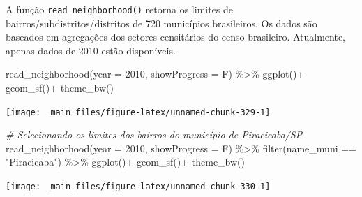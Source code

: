 \documentclass[
  brazilian,
]{book}
\newenvironment{Shaded}{\begin{snugshade}}{\end{snugshade}}
\newcommand{\AttributeTok}[1]{\textcolor[rgb]{0.77,0.63,0.00}{#1}}
\newcommand{\CommentTok}[1]{\textcolor[rgb]{0.56,0.35,0.01}{\textit{#1}}}
\newcommand{\DecValTok}[1]{\textcolor[rgb]{0.00,0.00,0.81}{#1}}
\newcommand{\FunctionTok}[1]{\textcolor[rgb]{0.00,0.00,0.00}{#1}}
\newcommand{\NormalTok}[1]{#1}
\newcommand{\SpecialCharTok}[1]{\textcolor[rgb]{0.00,0.00,0.00}{#1}}
\newcommand{\StringTok}[1]{\textcolor[rgb]{0.31,0.60,0.02}{#1}}
\begin{document}
A função \texttt{read\_neighborhood()} retorna os limites de bairros/subdistritos/distritos de 720 municípios brasileiros. Os dados são baseados em agregações dos setores censitários do censo brasileiro. Atualmente, apenas dados de 2010 estão disponíveis.

\begin{Shaded}
\begin{Highlighting}[]
\FunctionTok{read\_neighborhood}\NormalTok{(}\AttributeTok{year =} \DecValTok{2010}\NormalTok{,}
                  \AttributeTok{showProgress =}\NormalTok{ F) }\SpecialCharTok{\%\textgreater{}\%} 
  \FunctionTok{ggplot}\NormalTok{()}\SpecialCharTok{+}
  \FunctionTok{geom\_sf}\NormalTok{()}\SpecialCharTok{+}
  \FunctionTok{theme\_bw}\NormalTok{()}
\end{Highlighting}
\end{Shaded}

\begin{center}\texttt{[image: \_main\_files/figure-latex/unnamed-chunk-329-1]} \end{center}

\begin{Shaded}
\begin{Highlighting}[]
\CommentTok{\# Selecionando os limites dos bairros do município de Piracicaba/SP}
\FunctionTok{read\_neighborhood}\NormalTok{(}\AttributeTok{year =} \DecValTok{2010}\NormalTok{,}
                  \AttributeTok{showProgress =}\NormalTok{ F) }\SpecialCharTok{\%\textgreater{}\%} 
  \FunctionTok{filter}\NormalTok{(name\_muni }\SpecialCharTok{==} \StringTok{"Piracicaba"}\NormalTok{) }\SpecialCharTok{\%\textgreater{}\%}
  \FunctionTok{ggplot}\NormalTok{()}\SpecialCharTok{+}
  \FunctionTok{geom\_sf}\NormalTok{()}\SpecialCharTok{+}
  \FunctionTok{theme\_bw}\NormalTok{()}
\end{Highlighting}
\end{Shaded}

\begin{center}\texttt{[image: \_main\_files/figure-latex/unnamed-chunk-330-1]} \end{center}
\end{document}
